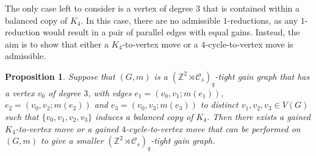 \documentclass[reqno,a4paper,10pt]{article}
\newtheorem{proposition}[theorem]{Proposition}
\theoremstyle{definition}
\theoremstyle{remark}
\numberwithin{equation}{section}
\numberwithin{figure}{section}
\numberwithin{table}{section}
\newcommand{\Z}{\mathbb{Z}}
\begin{document}
    The only case left to consider is a vertex of degree $3$ that is contained within a balanced copy of $K_4$. In this case, there are no admissible $1$-reductions, as any $1$-reduction would result in a pair of parallel edges with equal gains. Instead, the aim is to show that either a $K_4$-to-vertex move or a $4$-cycle-to-vertex move is admissible.

    \begin{proposition}\label{ZReflectivelqBalancedK4}
		Suppose that $(G,m)$ is a $(\Z^2\rtimes\mathcal{C}_s)_q$-tight gain graph that has a vertex $v_0$ of degree $3$, with edges $e_1=(v_0,v_1;m(e_1))$, $e_2=(v_0,v_2;m(e_2))$ and $e_3=(v_0,v_3;m(e_3))$ to distinct $v_1,v_2,v_3\in V(G)$ such that $\{v_0,v_1,v_2,v_3\}$ induces a balanced copy of $K_4$. Then there exists a gained $K_4$-to-vertex move or a gained $4$-cycle-to-vertex move that can be performed on $(G,m)$ to give a smaller $(\Z^2\rtimes\mathcal{C}_s)_q$-tight gain graph.
	\end{proposition}
\end{document}
